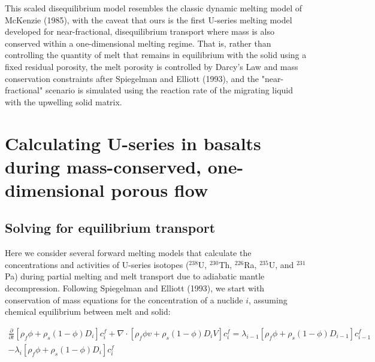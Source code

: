 \documentclass[11pt]{article}
\begin{document}
This scaled disequilibrium model resembles the classic dynamic melting model of McKenzie (1985), with the caveat that ours is the first U-series melting model developed for near-fractional, disequilibrium transport where mass is also conserved within a one-dimensional melting regime. That is, rather than controlling the quantity of melt that remains in equilibrium with the solid using a fixed residual porosity, the melt porosity is controlled by Darcy's Law and mass conservation constraints after Spiegelman and Elliott (1993), and the "near-fractional" scenario is simulated using the reaction rate of the migrating liquid with the upwelling solid matrix.

    \hypertarget{calculating-u-series-in-basalts-during-mass-conserved-one-dimensional-porous-flow}{%
\section{Calculating U-series in basalts during mass-conserved, one-dimensional porous flow}\label{calculating-u-series-in-basalts-during-mass-conserved-one-dimensional-porous-flow}}

\hypertarget{solving-for-equilibrium-transport}{%
\subsection{Solving for equilibrium transport}\label{solving-for-equilibrium-transport}}

Here we consider several forward melting models that  calculate the concentrations and activities of U-series isotopes ($^{238}$U, $^{230}$Th, $^{226}$Ra, $^{235}$U, and $^{231}$Pa) during  partial melting and melt transport due to  adiabatic mantle decompression. Following Spiegelman and Elliott (1993), we start with conservation of mass equations for the concentration of a nuclide $i$, assuming chemical equilibrium between melt and solid:

\begin{equation}\label{eq:1}
    \begin{aligned}
        \frac{\partial}{\partial t}[\rho_{f} \phi + \rho_{s}(1-\phi)D_i]c_{i}^f + \nabla \cdot [\rho_f \phi v + \rho_s (1 - \phi) D_i V] c_i^f = \lambda_{i-1}[\rho_f \phi + \rho_s (1-\phi) D_{i-1}]c_{i-1}^f \\
        - \lambda_{i}[\rho_f \phi + \rho_s (1-\phi) D_{i}]c_{i}^f
    \end{aligned}
\end{equation}
\end{document}
